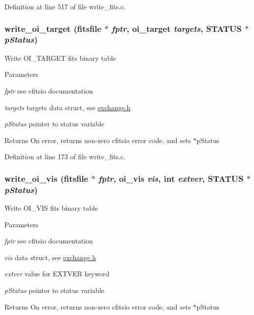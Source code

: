 Definition at line 517 of file write\_\-fits.c.

\hypertarget{group__oitable_ga57a8c8d6c20938a330d4830ac014d19e}{
\subsubsection[{write\_\-oi\_\-target}]{ write\_\-oi\_\-target (fitsfile $\ast$ {\em fptr}, \/  {\bf oi\_\-target} {\em targets}, \/  {\bf STATUS} $\ast$ {\em pStatus})}}
\label{group__oitable_ga57a8c8d6c20938a330d4830ac014d19e}
Write OI\_\-TARGET fits binary table


\begin{DoxyParams}{Parameters}
\item[{\em fptr}]see cfitsio documentation \item[{\em targets}]targets data struct, see \hyperlink{exchange_8h}{exchange.h} \item[{\em pStatus}]pointer to status variable\end{DoxyParams}
\begin{DoxyReturn}{Returns}
On error, returns non-\/zero cfitsio error code, and sets $\ast$pStatus 
\end{DoxyReturn}


Definition at line 173 of file write\_\-fits.c.

\hypertarget{group__oitable_ga06589bd77fa01b43a8e36acf2103de76}{
\subsubsection[{write\_\-oi\_\-vis}]{ write\_\-oi\_\-vis (fitsfile $\ast$ {\em fptr}, \/  {\bf oi\_\-vis} {\em vis}, \/  int {\em extver}, \/  {\bf STATUS} $\ast$ {\em pStatus})}}
\label{group__oitable_ga06589bd77fa01b43a8e36acf2103de76}
Write OI\_\-VIS fits binary table


\begin{DoxyParams}{Parameters}
\item[{\em fptr}]see cfitsio documentation \item[{\em vis}]data struct, see \hyperlink{exchange_8h}{exchange.h} \item[{\em extver}]value for EXTVER keyword \item[{\em pStatus}]pointer to status variable\end{DoxyParams}
\begin{DoxyReturn}{Returns}
On error, returns non-\/zero cfitsio error code, and sets $\ast$pStatus 
\end{DoxyReturn}


